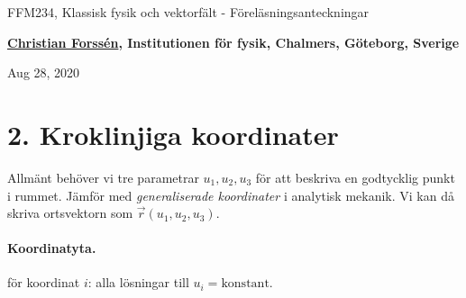 \documentclass[%
oneside,                 %
final,                   %
10pt]{article}
\begin{document}

\newcommand{\exercisesection}[1]{\subsection*{#1}}







\thispagestyle{empty}

\begin{center}
{\LARGE\bf
\begin{spacing}{1.25}
FFM234, Klassisk fysik och vektorfält - Föreläsningsanteckningar
\end{spacing}
}
\end{center}


\begin{center}
{\bf \href{{http://fy.chalmers.se/subatom/tsp/}}{Christian Forssén}, Institutionen för fysik, Chalmers, Göteborg, Sverige${}^{}$} \\ [0mm]
\end{center}

\begin{center}
\end{center}
    

\begin{center}
Aug 28, 2020
\end{center}

\vspace{1cm}


\section*{2. Kroklinjiga koordinater}

Allmänt behöver vi tre parametrar $u_1, u_2, u_3$ för att beskriva en godtycklig punkt i rummet. Jämför med \emph{generaliserade koordinater} i analytisk mekanik. Vi kan då skriva ortsvektorn som $\vec{r}(u_1, u_2, u_3)$.  

\paragraph{Koordinatyta.}
för koordinat $i$: alla lösningar till $u_i = \mathrm{konstant}$.
\end{document}
